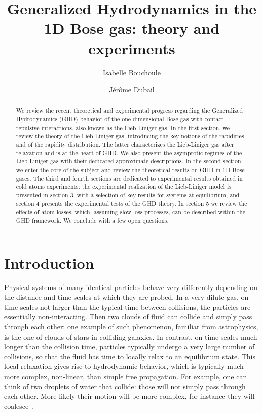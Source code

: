 \documentclass[onecolumn,amsfonts,showpacs,superscriptaddress]{revtex4-1}
\begin{document}
\title{Generalized Hydrodynamics in the 1D Bose gas: theory and experiments}


\author{Isabelle Bouchoule}
\author{J\'er\^ome Dubail}



\begin{abstract}
	We review the recent theoretical and experimental progress regarding the Generalized Hydrodynamics (GHD) behavior of the one-dimensional Bose gas with contact repulsive interactions, also known as the Lieb-Liniger gas. 
	In the first section, we review the theory of the Lieb-Liniger gas, introducing the key notions of the rapidities and of the rapidity distribution. The latter characterizes the Lieb-Liniger gas after relaxation and is at the heart of GHD. We also present the asymptotic regimes of the Lieb-Liniger gas with their dedicated approximate descriptions. In the second section we enter the core of the subject and review the theoretical results on GHD in 1D Bose gases. The third and fourth sections are dedicated to experimental results obtained in cold atoms experiments: the experimental realization of the Lieb-Liniger model is presented in section 3, with a selection of key results for systems at equilibrium, and section 4 presents the experimental tests of the GHD theory.
	In section 5 we review the effects of atom losses, which, assuming slow loss processes, can be described within the GHD framework. We conclude with a few open questions. 
\end{abstract}


\maketitle



\section*{Introduction}

Physical systems of many identical particles behave very differently depending on the distance and time scales at which they are probed. In a very dilute gas, on time scales not larger than the typical time between collisions, the particles are essentially non-interacting. Then two clouds of fluid can collide and simply pass through each other; one example of such phenomenon, familiar from astrophysics, is the one of clouds of stars in colliding galaxies. In contrast, on time scales much longer than the collision time, particles typically undergo a very large number of collisions, so that the fluid has time to locally relax to an equilibrium state. This local relaxation gives rise to hydrodynamic behavior, which is typically much more complex, non-linear, than simple free propagation. For example, one can think of two droplets of water that collide: those will not simply pass through each other. More likely their motion will be more complex, for instance they will coalesce~\citep{brazier1972interaction}.
\end{document}
